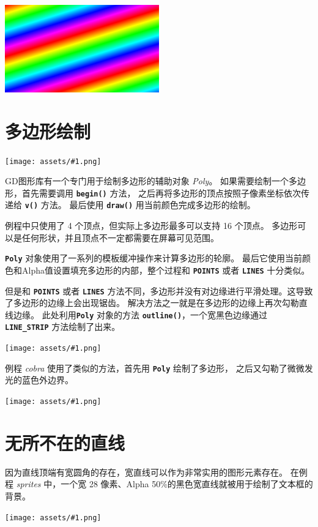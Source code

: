 \documentclass[10pt]{book}
\newcommand{\png}[1]{
\begin{center}
\texttt{[image: assets/\#1.png]}
\end{center}
}
\newcommand{\mach}[1]{\texttt{\textbf{#1}}}
\begin{document}
\begin{CJK}{UTF8}{gkai}
\begin{center}
\includegraphics[width=0.5\textwidth]{assets/0054.png}
\end{center}

\newpage
\section{多边形绘制}

\png{0050}

GD图形库有一个专门用于绘制多边形的辅助对象 \textit{Poly}。
如果需要绘制一个多边形，首先需要调用 \mach{begin()} 方法，
之后再将多边形的顶点按照子像素坐标依次传递给 \mach{v()} 方法。
最后使用 \mach{draw()} 用当前颜色完成多边形的绘制。

例程中只使用了 4 个顶点，但实际上多边形最多可以支持 16 个顶点。
多边形可以是任何形状，并且顶点不一定都需要在屏幕可见范围。

\mach{Poly} 对象使用了一系列的模板缓冲操作来计算多边形的轮廓。
最后它使用当前颜色和Alpha值设置填充多边形的内部，整个过程和 \mach{POINTS} 或者 \mach{LINES} 十分类似。


\newpage
但是和 \mach{POINTS} 或者 \mach{LINES} 方法不同，多边形并没有对边缘进行平滑处理。这导致了多边形的边缘上会出现锯齿。
解决方法之一就是在多边形的边缘上再次勾勒直线边缘。
此处利用\mach{Poly} 对象的方法 \mach{outline()}，一个宽黑色边缘通过
\mach{LINE\_STRIP} 方法绘制了出来。


\png{0051}

例程 \textit{cobra} 使用了类似的方法，首先用 \mach{Poly} 绘制了多边形，
之后又勾勒了微微发光的蓝色外边界。
\png{cobra}

\newpage
\section{无所不在的直线}

因为直线顶端有宽圆角的存在，宽直线可以作为非常实用的图形元素存在。
在例程 \textit{sprites} 中，一个宽 28 像素、Alpha 50\%的黑色宽直线就被用于绘制了文本框的背景。
\png{lines-el}


\end{CJK}
\end{document}
